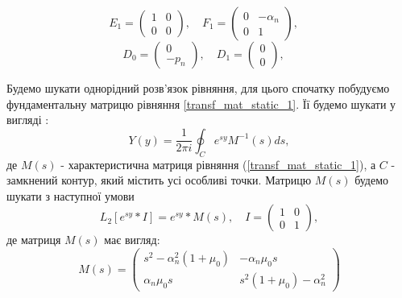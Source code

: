 \begin{equation*}
    E_1 = \begin{pmatrix}
        1 & 0 \\
        0 & 0
    \end{pmatrix}, \quad
    F_1 = \begin{pmatrix}
        0 & -\alpha_n \\
        0 & 1
    \end{pmatrix}, \quad
\end{equation*}
\begin{equation*}
    D_0 = \begin{pmatrix}
        0 \\
        -p_n
    \end{pmatrix}, \quad
    D_1 = \begin{pmatrix}
        0 \\
        0
    \end{pmatrix}, \quad
\end{equation*}

Будемо шукати однорідний розв'язок рівняння,
для цього спочатку побудуємо фундаментальну матрицю рівняння \eqref{transf_mat_static_1}.
Її будемо шукати у вигляді \cite{gantmaher}:
\begin{equation}
    Y(y) = \frac{1}{2\pi i} \oint_C e^{sy} M^{-1}(s)ds,
\end{equation}
де $M(s)$ - характеристична матриця рівняння (\ref{transf_mat_static_1}), а $C$ - замкнений контур, який містить усі особливі точки.
Матрицю $M(s)$ будемо шукати з наступної умови
\begin{equation}
    L_2\left[ e^{sy}*I \right] = e^{sy} * M(s), \quad I = \begin{pmatrix} 1 & 0 \\ 0 & 1 \end{pmatrix},
\end{equation}
де матриця $M(s)$ має вигляд:
\begin{equation}
    M(s) = \begin{pmatrix}
        s^2 -\alpha_n^2(1 + \mu_0) & -\alpha_n \mu_0 s \\
        \alpha_n \mu_0 s & s^2 (1 + \mu_0) -\alpha_n^2
     \end{pmatrix}
\end{equation}

